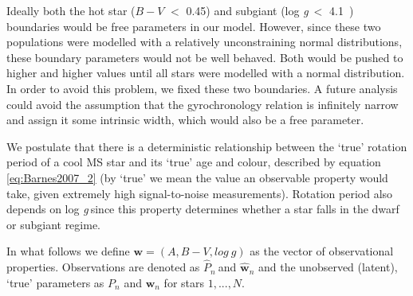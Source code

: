 \documentclass[11pt,preprint]{aastex}
\newcommand{\logg}{log \emph{g}}
\newcommand{\ph}{$\hat{P}_n$}
\newcommand{\ncooldwarfs}{45~}
\newcommand{\subcut}{4.1~}
\begin{document}
Ideally both the hot star ($B-V$ $<$ 0.45) and subgiant (\logg$~<$ \subcut)
boundaries would be free parameters in our model.
However, since these two populations were modelled with a relatively
unconstraining normal distributions, these boundary parameters would not be
well behaved.
Both would be pushed to higher and higher values until all stars were modelled
with a normal distribution.
In order to avoid this problem, we fixed these two boundaries.
A future analysis could avoid the assumption that the gyrochronology relation
is infinitely narrow and assign it some intrinsic width, which would also be
a free parameter.

We postulate that there is a deterministic relationship between the `true'
rotation period of a cool MS star and its `true' age and colour, described by
equation \ref{eq:Barnes2007_2} (by `true' we mean the value an observable
property would take, given extremely high signal-to-noise measurements).
Rotation period also depends on \logg$~$since this property determines whether
a star falls in the dwarf or subgiant regime.

In what follows we define $\mathbf{w} = (A, B-V, log~g)$ as the vector of
observational properties.
Observations are denoted as \ph$~$and $\hat{\mathbf{w}}_n$ and the unobserved
(latent), `true' parameters as $P_n$ and $\mathbf{w}_n$ for stars $1,...,N$.
\end{document}
